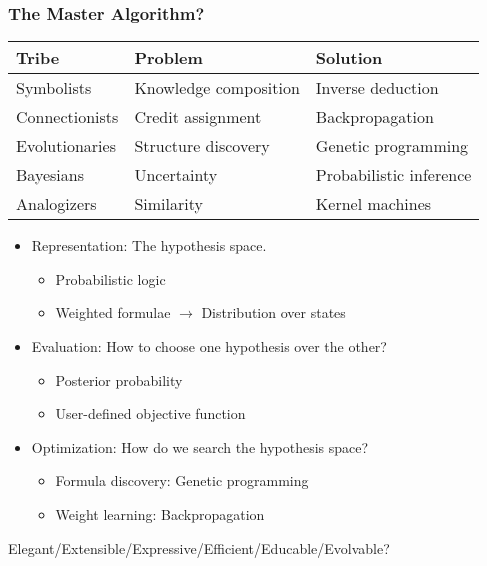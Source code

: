 \documentclass[UTF8,11pt,colorlinks,compress,openany]{beamer}%
\begin{document}
\begin{frame}\frametitle{The Master Algorithm?}
\begin{table}
\begin{tabu}{l|l|l}
\hline
\textbf{Tribe} &\textbf{Problem} &\textbf{Solution}\\
\hline
Symbolists &Knowledge composition &Inverse deduction\\
\hline
Connectionists &Credit assignment &Backpropagation\\
\hline
Evolutionaries &Structure discovery &Genetic programming\\
\hline
Bayesians &Uncertainty &Probabilistic inference\\
\hline
Analogizers &Similarity &Kernel machines\\
\hline
\end{tabu}
\end{table}
\begin{itemize}
	\item Representation: The hypothesis space.
		\begin{itemize}
			\item Probabilistic logic
			\item Weighted formulae $\to$ Distribution over states
		\end{itemize}
	\item Evaluation: How to choose one hypothesis over the other?
		\begin{itemize}
			\item Posterior probability
			\item User-defined objective function
		\end{itemize}
	\item Optimization: How do we search the hypothesis space?
		\begin{itemize}
			\item Formula discovery: Genetic programming
			\item Weight learning: Backpropagation
		\end{itemize}
\end{itemize}
\begin{center}
Elegant/Extensible/Expressive/Efficient/Educable/Evolvable?
\end{center}
\end{frame}
\end{document}
